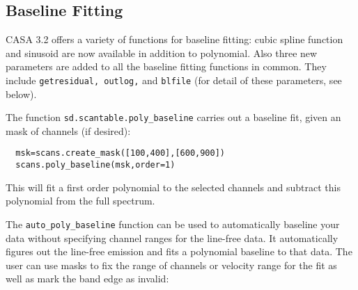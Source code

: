 \subsection{Baseline Fitting}
\label{subsection:sd.asap.BLfitting}

CASA 3.2 offers a variety of functions for baseline fitting: cubic 
spline function and sinusoid are now available in addition to polynomial. 
Also three new parameters are added to all the baseline fitting 
functions in common. They include {\tt getresidual, outlog,} and 
{\tt blfile} (for detail of these parameters, see below). 

The function {\tt sd.scantable.poly\_baseline} carries out a
baseline fit, given an mask of channels (if desired):
\small
\begin{verbatim}
  msk=scans.create_mask([100,400],[600,900])
  scans.poly_baseline(msk,order=1)
\end{verbatim}
\normalsize
This will fit a first order polynomial to the selected channels and
subtract this polynomial from the full spectrum.

The {\tt auto\_poly\_baseline} function can be used to automatically
baseline your data without specifying channel ranges for the
line-free data. It automatically figures out the line-free emission
and fits a polynomial baseline to that data. The user can use masks to
fix the range of channels or velocity range for the fit as well as
mark the band edge as invalid:


